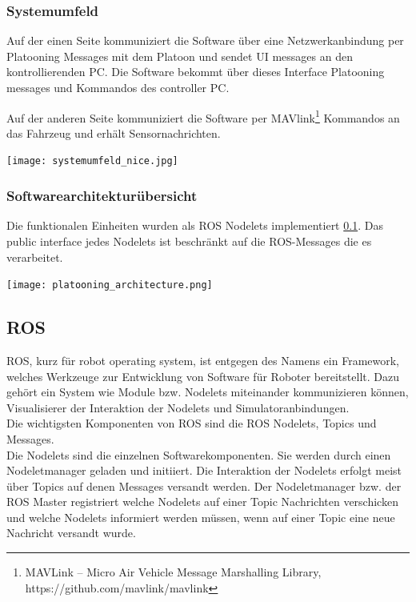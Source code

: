 \documentclass[a4paper, 12pt, titlepage]{scrartcl}
\begin{document}
		\subsubsection*{Systemumfeld}

		Auf der einen Seite kommuniziert die Software über eine Netzwerkanbindung per Platooning Messages mit dem Platoon und sendet UI messages an den kontrollierenden PC. Die Software bekommt über dieses Interface Platooning messages und Kommandos des controller PC.

		Auf der anderen Seite kommuniziert die Software per MAVlink\footnote{MAVLink -- Micro Air Vehicle Message Marshalling Library, https://github.com/mavlink/mavlink} Kommandos an das Fahrzeug und erhält Sensornachrichten.

 		\texttt{[image: systemumfeld\_nice.jpg]}

 		\subsubsection*{Softwarearchitekturübersicht}

 		Die funktionalen Einheiten wurden als ROS Nodelets implementiert \ref{ros}. Das public interface jedes Nodelets ist beschränkt auf die ROS-Messages die es verarbeitet.

		\newpage
 		\texttt{[image: platooning\_architecture.png]}

		\subsection{ROS}
		\label{ros}
		ROS, kurz für robot operating system, ist entgegen des Namens ein Framework, welches Werkzeuge zur Entwicklung von Software für Roboter bereitstellt. Dazu gehört ein System wie Module bzw. Nodelets miteinander kommunizieren können, Visualisierer der Interaktion der Nodelets und Simulatoranbindungen.\\

		Die wichtigsten Komponenten von ROS sind die ROS Nodelets, Topics und Messages. \\

		Die Nodelets sind die einzelnen Softwarekomponenten. Sie werden durch einen Nodeletmanager geladen und initiiert. Die Interaktion der Nodelets erfolgt meist über Topics auf denen Messages versandt werden. Der Nodeletmanager bzw. der ROS Master registriert welche Nodelets auf einer Topic Nachrichten verschicken und welche Nodelets informiert werden müssen, wenn auf einer Topic eine neue Nachricht versandt wurde.\\
\end{document}
